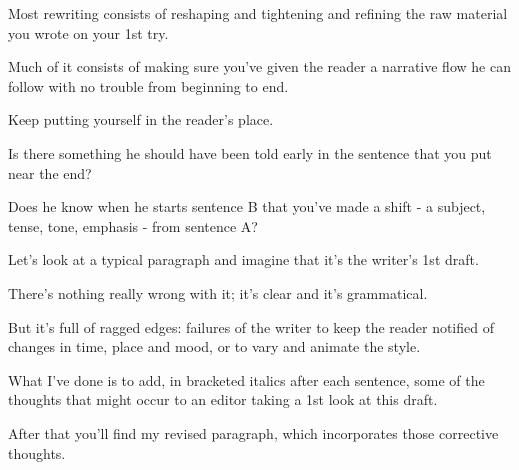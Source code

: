 \documentclass{book}
\numberwithin{equation}{section}
\begin{document}
Most rewriting consists of reshaping and tightening and refining the raw material you wrote on your 1st try.

Much of it consists of making sure you've given the reader a narrative flow he can follow with no trouble from beginning to end.

Keep putting yourself in the reader's place.

Is there something he should have been told early in the sentence that you put near the end?

Does he know when he starts sentence B that you've made a shift - a subject, tense, tone, emphasis - from sentence A?

%
Let's look at a typical paragraph and imagine that it's the writer's 1st draft.

There's nothing really wrong with it; it's clear and it's grammatical.

But it's full of ragged edges: failures of the writer to keep the reader notified of changes in time, place and mood, or to vary and animate the style.

What I've done is to add, in bracketed italics after each sentence, some of the thoughts that might occur to an editor taking a 1st look at this draft.

After that you'll find my revised paragraph, which incorporates those corrective thoughts.
\end{document}
